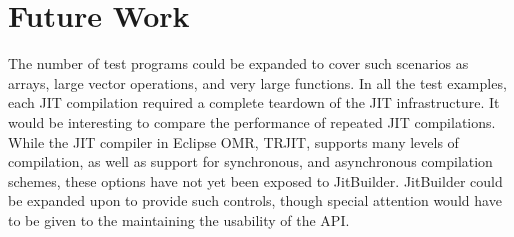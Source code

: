 \section{Future Work}
\label{sec:future-work}
The number of test programs could be expanded to cover such scenarios as arrays, large vector operations, and very large functions.
In all the test examples, each JIT compilation required a complete teardown of the JIT infrastructure. 
It would be interesting to compare the performance of repeated JIT compilations.
While the JIT compiler in Eclipse OMR, TRJIT, supports many levels of compilation, as well as support for synchronous, and asynchronous compilation schemes, these options have not yet been exposed to JitBuilder.
JitBuilder could be expanded upon to provide such controls, though special attention would have to be given to the maintaining the usability of the API.